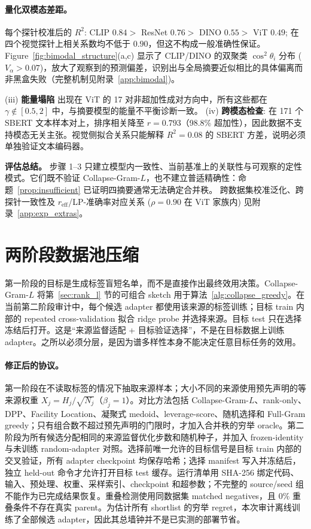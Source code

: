 \documentclass{article}
\newcommand{\reff}{\ensuremath{r_{\mathrm{eff}}}\xspace}
\begin{document}
\paragraph{量化双模态差距。}
每个探针校准后的 $R^2$: CLIP $0.84>$ ResNet $0.76>$ DINO $0.55>$ ViT $0.49$;
在四个视觉探针上相关系数均不低于 $0.90$，但这不构成一般准确性保证。
Figure~\ref{fig:bimodal_structure}(a,c) 显示了 CLIP/DINO 的双聚类 $\cos^2\theta_i$ 分布 ($V_\alpha > 0.07$)，放大了观察到的预测偏差，识别出与全局摘要近似相比的具体偏离而非黑盒失败（完整机制见附录~\ref{app:bimodal})。

(iii) \textbf{能量塌陷} 出现在 ViT 的 17 对非超加性成对方向中，所有这些都在 $\gamma \notin [0.5,2]$ 中，与摘要模型的能量不平衡诊断一致。
(iv) \textbf{跨模态检查}: 在 171 个 SBERT 文本样本对上，排序相关降至 $r=0.793$（98.8\% 超加性），因此数据不支持模态无关主张。视觉侧拟合关系只能解释 $R^2=0.08$ 的 SBERT 方差，说明必须单独验证文本编码器。

\textbf{评估总结。}
步骤 1--3 只建立模型内一致性、当前基准上的关联性与可观察的定性模式。它们既不验证 Collapse-Gram-$L$，也不建立普适精确性：命题~\ref{prop:insufficient} 已证明四摘要通常无法确定合并秩。
跨数据集校准泛化、跨探针一致性及 $\reff$/LP-准确率对应关系 ($\rho = 0.90$ 在 ViT 家族内) 见附录~\ref{app:exp_extras}。

\section{两阶段数据池压缩}
\label{sec:applications}
\label{sec:compression}
\label{sec:pool_selection}

第一阶段的目标是生成标签盲短名单，而不是直接作出最终效用决策。Collapse-Gram-$L$ 将第~\ref{sec:rank_l} 节的可组合 sketch 用于算法~\ref{alg:collapse_greedy}。在当前第二阶段审计中，每个候选 adapter 都使用该来源的标签训练；目标 train 内部的 repeated cross-validation 拟合 ridge probe 并选择来源。目标 test 只在选择冻结后打开。这是“来源监督适配 + 目标验证选择”，不是在目标数据上训练 adapter。之所以必须分层，是因为谱多样性本身不能决定任意目标任务的效用。

\paragraph{修正后的协议。}
第一阶段在不读取标签的情况下抽取来源样本；大小不同的来源使用预先声明的等来源权重 $X_j=H_j/\sqrt{N_j}$（$\beta_j=1$）。对比方法包括 Collapse-Gram-$L$、rank-only、DPP、Facility Location、凝聚式 medoid、leverage-score、随机选择和 Full-Gram greedy；只有组合数不超过预先声明的门限时，才加入合并秩的穷举 oracle。第二阶段为所有候选分配相同的来源监督优化步数和随机种子，并加入 frozen-identity 与未训练 random-adapter 对照。选择前唯一允许的目标信号是目标 train 内部的交叉验证，所有 adapter checkpoint 均保存哈希；选择 manifest 写入并冻结后，独立 held-out 命令才允许打开目标 test 缓存。运行清单用 SHA-256 绑定代码、输入、预处理、权重、采样索引、checkpoint 和超参数；不完整的 source/seed 组不能作为已完成结果恢复。重叠检测使用同数据集 matched negatives，且 $0\%$ 重叠条件不存在真实 parent。为估计所有 shortlist 的穷举 regret，本次审计离线训练了全部候选 adapter，因此其总墙钟并不是已实测的部署节省。
\end{document}
